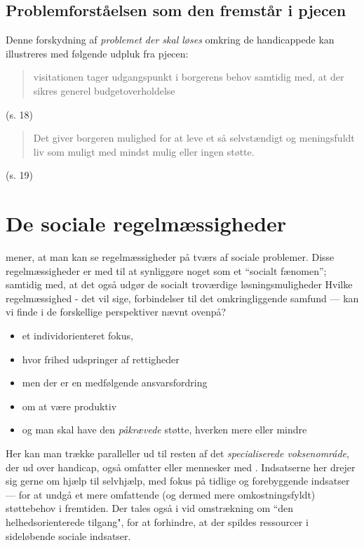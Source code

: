 \subsection{Problemforståelsen som den fremstår i pjecen}
Denne forskydning af \textit{problemet der skal løses} omkring de handicappede kan illustreres med følgende udpluk fra pjecen: 
\blockquote{visitationen tager udgangspunkt i borgerens behov samtidig med, at der sikres generel budgetoverholdelse} (s. 18)
\blockquote{Det giver borgeren mulighed for at leve et så selvstændigt og meningsfuldt liv som muligt med mindst mulig eller ingen støtte.}(s. 19)
\section{De sociale regelmæssigheder}

\citeauthor{scheurichPolicyArchaeologyNew1994} mener, at man kan se regelmæssigheder på tværs af sociale problemer.
Disse regelmæssigheder er med til at synliggøre noget som et “socialt fænomen”; samtidig med, at det også udgør de socialt troværdige løsningsmuligheder \cite[s. 301]{scheurichPolicyArchaeologyNew1994}
Hvilke regelmæssighed - det vil sige, forbindelser til det omkringliggende samfund — kan vi finde i de forskellige perspektiver nævnt ovenpå?

\begin{itemize}
  \item
    et individorienteret fokus, 
  \item
    hvor frihed udspringer af rettigheder
  \item
    men der er en medfølgende ansvarsfordring
  \item
    om at være produktiv
  \item
    og man skal have den \textit{påkrævede} støtte, hverken mere eller mindre
\end{itemize}


Her kan man trække paralleller ud til resten af det \textit{specialiserede voksenomráde}, der ud over handicap, også omfatter  eller mennesker med  \autocite[s. 2]{kommunerneslandsforeningFaktaOmKommnernes2019}.
Indsatserne her drejer sig gerne om hjælp til selvhjælp, med fokus på tidlige og forebyggende indsatser — for at undgå et mere omfattende (og dermed mere omkostningsfyldt) støttebehov i fremtiden. Der tales også i vid omstrækning om “den helhedsorienterede tilgang", for at forhindre, at der spildes ressourcer i sideløbende sociale indsatser. \autocite[s. 18]{klStyringAfDet2017}

